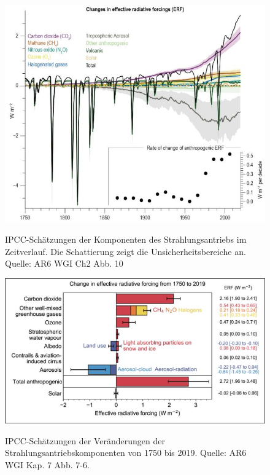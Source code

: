 \documentclass[12pt,paper=a4,DIV=12,parskip=never,chapterprefix=false,headings=standardclasses]{scrreprt}
\numberwithin{figure}{chapter}
\begin{document}
\begin{figure}[H]
\begin{center}
\includegraphics[width=1.0\textwidth]{bilder/bilderKlima-0006.jpg}\\[1cm]
\end{center}
\caption{IPCC-Schätzungen der Komponenten des Strahlungsantriebs im Zeitverlauf. Die Schattierung zeigt
die Unsicherheitsbereiche an. Quelle: AR6 WGI Ch2 Abb. 10}
\end{figure}

\begin{figure}[H]
\begin{center}
\includegraphics[width=1.0\textwidth]{bilder/bilderKlima-0007.jpg}\\[1cm]
\end{center}
\caption{IPCC-Schätzungen der Veränderungen der Strahlungsantriebskomponenten von 1750 bis 2019. Quelle:
AR6 WGI Kap. 7 Abb. 7-6.}
\end{figure}
\end{document}
